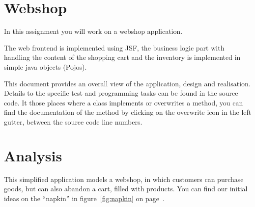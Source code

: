 \section{Webshop}

In this assignment you will work on a webshop application.

The web frontend is implemented using JSF, the business logic part
with handling the content of the shopping 
cart and the inventory is implemented in simple java objects (Pojos).



This document provides an overall view of the application, design and
realisation. Details to the specific test and programming tasks can be
found in the source code. It those places where a class implements or
overwrites a method, you can find the documentation of the method by
clicking on the overwrite icon in the left gutter, between the source
code line numbers. 

\section{Analysis}
This simplified application models a webshop, in which customers can
purchase goods, but can also abandon a cart, filled with products. You
can find our initial ideas on the ``napkin'' in
figure~\ref{fig:napkin} on page~\pageref{fig:napkin}.


